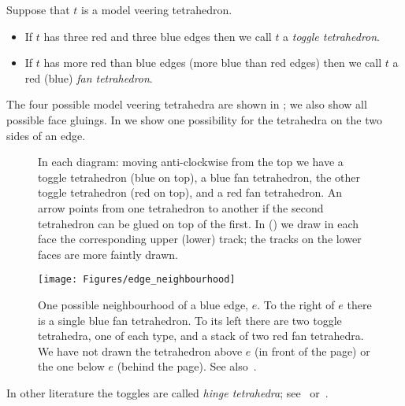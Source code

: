 \documentclass[12pt]{amsart}
\begin{document}
\begin{definition}
\label{Def:FanToggle}
Suppose that $t$ is a model veering tetrahedron.
\begin{itemize}
\item
If $t$ has three red and three blue edges then we call $t$ a \emph{toggle tetrahedron}.  
\item
If $t$ has more red than blue edges (more blue than red edges) then we call $t$ a red (blue) \emph{fan tetrahedron}.   \qedhere
\end{itemize}
\end{definition}

The four possible model veering tetrahedra are shown in ; we also show all possible face gluings.  In  we show one possibility for the tetrahedra on the two sides of an edge. 

\begin{figure}[htb]
\centering
{}
\thinspace
{}
\caption{In each diagram: moving anti-clockwise from the top we have a toggle tetrahedron (blue on top), a blue fan tetrahedron, the other toggle tetrahedron (red on top), and a red fan tetrahedron.  An arrow points from one tetrahedron to another if the second tetrahedron can be glued on top of the first.  In  () we draw in each face the corresponding upper (lower) track; the tracks on the lower faces are more faintly drawn.}
\label{Fig:GluingAutomaton}
\end{figure}

\begin{figure}[htbp]
\texttt{[image: Figures/edge\_neighbourhood]}
\caption{One possible neighbourhood of a blue edge, $e$.  To the right of $e$ there is a single blue fan tetrahedron.  To its left there are two toggle tetrahedra, one of each type, and a stack of two red fan tetrahedra.  We have not drawn the tetrahedron above $e$ (in front of the page) or the one below $e$ (behind the page).  See also~\cite[Figure~12]{Agol11}.}
\label{Fig:EdgeNeighbourhood}
\end{figure}

\begin{remark}
In other literature the toggles are called \emph{hinge tetrahedra}; see~\cite[page~1247]{Gueritaud06} or~\cite[page~211]{FuterGueritaud13}. 
\end{remark}
\end{document}
